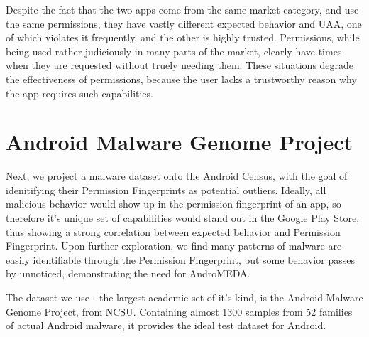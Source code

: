 Despite the fact that the two apps come from the same market category, and use the same permissions, they have vastly different expected behavior and UAA, one of which violates it frequently, and the other is highly trusted. Permissions, while being used rather judiciously in many parts of the market, clearly have times when they are requested without truely needing them. These situations degrade the effectiveness of permissions, because the user lacks a trustworthy reason why the app requires such capabilities.







\section{Android Malware Genome Project}
Next, we project a malware dataset onto the Android Census, with the goal of idenitifying their Permission Fingerprints as potential outliers. Ideally, all malicious behavior would show up in the permission fingerprint of an app, so therefore it's unique set of capabilities would stand out in the Google Play Store, thus showing a strong correlation between expected behavior and Permission Fingerprint. Upon further exploration, we find many patterns of malware are easily identifiable through the Permission Fingerprint, but some behavior passes by unnoticed, demonstrating the need for AndroMEDA.

The dataset we use - the largest academic set of it's kind, is the Android Malware Genome Project\citep{zhou2012dissecting}, from NCSU. Containing almost 1300 samples from 52 families of actual Android malware, it provides the ideal test dataset for Android. 

